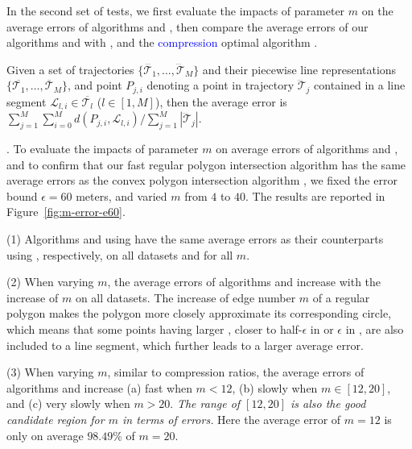{In the second set of tests, we first evaluate the impacts of parameter $m$ on the average errors of algorithms \cist and \cista, then compare the average errors of our algorithms \cist and \cista with \dps, \squishe and the \textcolor{blue}{compression} optimal algorithm \osed.

Given a set of trajectories $\{\dddot{\mathcal{T}_1}, \ldots, \dddot{\mathcal{T}}_M\}$ and their piecewise line representations $\{\overline{\mathcal{T}_1}, \ldots, \overline{\mathcal{T}}_M\}$, and point $P_{j,i}$ denoting
a point in trajectory $\dddot{\mathcal{T}}_j$ contained in a line segment $\mathcal{L}_{l,i}\in\overline{\mathcal{T}_l}$ ($l\in[1,M]$),
then the average error is $\sum_{j=1}^{M}\sum_{i=0}^{M} d(P_{j,i},
\mathcal{L}_{l,i})/\sum_{j=1}^{M}{|\dddot{\mathcal{T}}_j |}$.




.
To evaluate the impacts of parameter $m$ on average errors of algorithms \cist and \cista, and to confirm that our fast regular polygon intersection algorithm \rpia has the same average errors as the convex polygon intersection algorithm \cpia,
we fixed the error bound {$\epsilon =60$ meters}, and varied $m$ from $4$ to $40$. The results are reported in Figure~\ref{fig:m-error-e60}.



\ni(1) Algorithms \cist and \cista using \rpia have the same average errors as their counterparts using \cpia, respectively, on all datasets and for all $m$.

\ni(2) When varying $m$, the average errors of algorithms \cist and \cista increase with the increase of $m$ on all datasets.
{The increase of edge number $m$ of a regular polygon makes the polygon more closely approximate its corresponding circle, which means that some points having larger \sed, \ie closer to half-$\epsilon$ in \cist or $\epsilon$ in \cista, are also included to a line segment, which further leads to a larger average error.}

\ni(3) When varying $m$, similar to compression ratios, the average errors of
algorithms \cist and \cista increase (a) fast when $m < 12$, (b) slowly when $m
\in [12, 20]$, and (c) very slowly when $m > 20$.
\emph{The range of $[12, 20]$ is also the good candidate region for $m$ in terms of errors.}
Here the average error of $m=12$ is only on average {$98.49\%$} of $m=20$.




}
